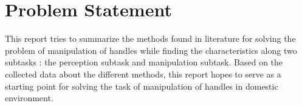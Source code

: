     \section{Problem Statement}
    This report tries to summarize the methods found in literature for solving the problem of manipulation of handles while finding the characteristics along two subtasks : the perception subtask and manipulation subtask. Based on the collected data about the different methods, this report hopes to serve as a starting point for solving the task of manipulation of handles in domestic environment. 
    
    

